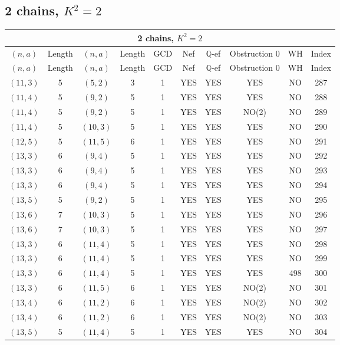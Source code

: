 \subsection{2 chains, $K^2 = 2$}
\begin{longtable}{|c|c|c|c|c|c|c|c|c|c|}
\hline
\multicolumn{10}{|c|}{2 chains, $K^2 = 2$}\\
\hline
$(n,a)$ & Length & $(n,a)$ & Length & GCD & Nef & $\mathbb Q$-ef & Obstruction 0 & WH & Index\\
\hline
\endfirsthead

\hline
$(n,a)$ & Length & $(n,a)$ & Length & GCD & Nef & $\mathbb Q$-ef & Obstruction 0 & WH & Index\\
\hline
\endhead
\hline
\endfoot

$(11, 3)$ & 5 & $(5, 2)$ & 3 & 1 & YES & YES & YES & NO & 287\\
$(11, 4)$ & 5 & $(9, 2)$ & 5 & 1 & YES & YES & YES & NO & 288\\
$(11, 4)$ & 5 & $(9, 2)$ & 5 & 1 & YES & YES & NO(2) & NO & 289\\
$(11, 4)$ & 5 & $(10, 3)$ & 5 & 1 & YES & YES & YES & NO & 290\\
$(12, 5)$ & 5 & $(11, 5)$ & 6 & 1 & YES & YES & YES & NO & 291\\
$(13, 3)$ & 6 & $(9, 4)$ & 5 & 1 & YES & YES & YES & NO & 292\\
$(13, 3)$ & 6 & $(9, 4)$ & 5 & 1 & YES & YES & YES & NO & 293\\
$(13, 3)$ & 6 & $(9, 4)$ & 5 & 1 & YES & YES & YES & NO & 294\\
$(13, 5)$ & 5 & $(9, 2)$ & 5 & 1 & YES & YES & YES & NO & 295\\
$(13, 6)$ & 7 & $(10, 3)$ & 5 & 1 & YES & YES & YES & NO & 296\\
$(13, 6)$ & 7 & $(10, 3)$ & 5 & 1 & YES & YES & YES & NO & 297\\
$(13, 3)$ & 6 & $(11, 4)$ & 5 & 1 & YES & YES & YES & NO & 298\\
$(13, 3)$ & 6 & $(11, 4)$ & 5 & 1 & YES & YES & YES & NO & 299\\
$(13, 3)$ & 6 & $(11, 4)$ & 5 & 1 & YES & YES & YES & 498 & 300\\
$(13, 3)$ & 6 & $(11, 5)$ & 6 & 1 & YES & YES & NO(2) & NO & 301\\
$(13, 4)$ & 6 & $(11, 2)$ & 6 & 1 & YES & YES & NO(2) & NO & 302\\
$(13, 4)$ & 6 & $(11, 2)$ & 6 & 1 & YES & YES & NO(2) & NO & 303\\
$(13, 5)$ & 5 & $(11, 4)$ & 5 & 1 & YES & YES & YES & NO & 304\\

\end{longtable}
